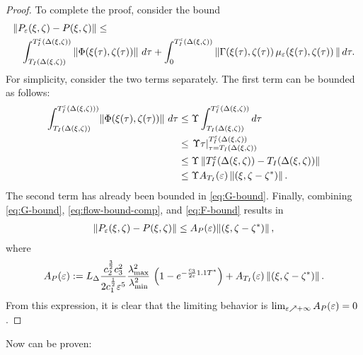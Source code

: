 \begin{proof}
  To complete the proof, consider the bound
  \begin{align}
    \label{eq:flow-bound-comp}
    \lefteqn{\left\| \Pe\argsxz - \P\argsxz \right\| \leq}\\
    \nonumber
    && \int_{\TIDelta}^{\TIeDelta} \left\| \bigF\argsxztau \right\| \, d\tau  +
    \int_{0}^{\TIeDelta} \left\| \bigG\argsxztau \, \mueps\argsxztau \, \right\|
    d\tau.
  \end{align}
  For simplicity, consider the two terms separately.
  The first term can be bounded as follows:
  \begin{align}
    \nonumber
    \int_{T_{I}(\Delta(\xi, \zeta))}^{T_{I}^{\varepsilon}(\Delta(\xi, \zeta)))} \! \left\| \Phi(\xi(\tau), \zeta(\tau)) \right\| \, d\tau
    &\leq \Upsilon \int_{T_{I}(\Delta(\xi, \zeta))}^{T_{I}^{\varepsilon}(\Delta(\xi, \zeta))} d\tau\\
    \nonumber
    &\leq \left.\Upsilon \tau\right|_{\tau=T_{I}(\Delta(\xi, \zeta))}^{T_{I}^{\varepsilon}(\Delta(\xi, \zeta))}\\
    \nonumber
    &\leq \Upsilon \left\|T_{I}^{\varepsilon}(\Delta(\xi, \zeta)) - T_{I}(\Delta(\xi, \zeta))\right\|\\
    &\leq \Upsilon A_{T_{I}}(\varepsilon) \left\|(\xi, \zeta - \zeta^{*})\right\|.
    \label{eq:F-bound}
  \end{align}
  The second term has already been bounded in \eqref{eq:G-bound}.
  Finally, combining \eqref{eq:G-bound}, \eqref{eq:flow-bound-comp}, and
  \eqref{eq:F-bound} results in
  \begin{align*}
    \left\| P_{\varepsilon}(\xi, \zeta) - P(\xi, \zeta) \right\| \leq A_{P}(\varepsilon) \! \left\|(\xi, \zeta - \zeta^{*})\right\|,
  \end{align*}
  where
  \begin{align*}
    \Ae := \LDelta \frac{c_{2}^{\frac{3}{2}}
      c_{3}^{2}}{2c_{1}^{\frac{1}{2}}\resclfparam^{5}}
    \frac{\lambdamaxG^{2}}{\lambdaminG^{2}}  \, \left(1 -
      e^{-\frac{c_{3}}{2\resclfparam} 1.1 \Tst}\right) +
    \ATIe\nzdxzst. %
  \end{align*}
  From this expression, it is clear that the limiting behavior is $\lim_{\varepsilon \nearrow +\infty} A_{P}(\varepsilon) =
  0$.
\end{proof}


Now  can be proven:

